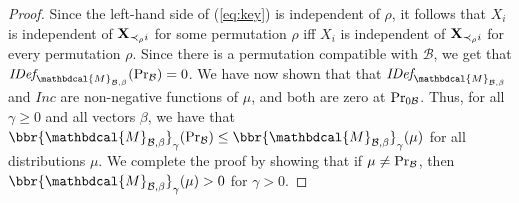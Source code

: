 \documentclass[letterpaper]{article} %
\theoremstyle{plain}
\theoremstyle{definition}
\theoremstyle{remark}
\newcommand{\dg}[1]{\mathbdcal{#1}}
\newcommand{\IDef}[1]{\mathit{IDef}_{\!#1}}
\newcommand\Inc{\mathit{Inc}}
\newcommand{\PDGof}[1]{{\dg M}_{#1}}
\begin{document}
\begin{proof}
Since the left-hand side of (\ref{eq:key}) is independent of $\rho$,
it follows that $X_i$ is independent of 
${\bf X}_{\prec_\rho i}$ for some permutation $\rho$ iff $X_i$ is independent of
  ${\bf X}_{\prec_\rho i}$ for every permutation $\rho$.  Since there
is a permutation compatible with $\mathcal B$, we get that 
$\IDef{\PDGof{\mathcal B,\beta}}(\Pr_{\cal B}) = 0$.
We have now shown that that $\IDef{\PDGof{\mathcal B, \beta}}$ and $\Inc$ are 
non-negative functions of $\mu$, and both are zero at $\Pr_{0\cal B}$. 
Thus, for all $\gamma \geq 0$ and all vectors $\beta$, we
have that   $\bbr{\PDGof{\mathcal B, \beta}}_\gamma( \Pr_{\cal
  B}) \le \bbr{\PDGof{\mathcal B, \beta}}_\gamma( \mu)$ for all
distributions $\mu$.  We complete the proof by showing that if
$\mu \ne \Pr_{\cal B}$, then 
$\bbr{\PDGof{\mathcal B, \beta}}_\gamma(\mu) > 0$
for $\gamma > 0$.


\end{proof}
\end{document}
